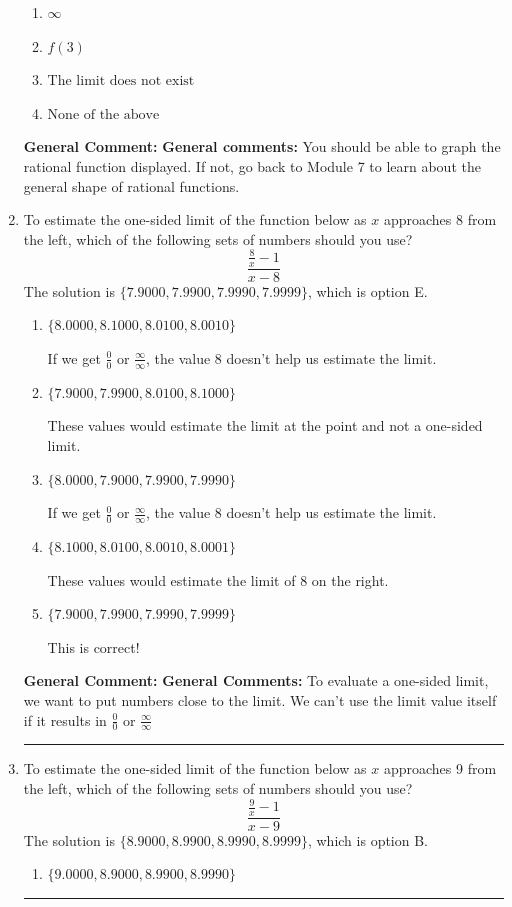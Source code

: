 \documentclass{extbook}[14pt]
\newcommand{\litem}[1]{\item #1

\rule{\textwidth}{0.4pt}}
\begin{document}
\begin{enumerate}
{\begin{enumerate}[label=\Alph*.]
\item \( \infty \)


\item \( f(3) \)


\item \( \text{The limit does not exist} \)


\item \( \text{None of the above} \)


\end{enumerate}

\textbf{General Comment:} \textbf{General comments:} You should be able to graph the rational function displayed. If not, go back to Module 7 to learn about the general shape of rational functions.
}
\litem{
To estimate the one-sided limit of the function below as $x$ approaches 8 from the left, which of the following sets of numbers should you use?
\[ \frac{\frac{8}{x} - 1}{x - 8} \]The solution is \( \{ 7.9000, 7.9900, 7.9990, 7.9999 \} \), which is option E.\begin{enumerate}[label=\Alph*.]
\item \( \{ 8.0000, 8.1000, 8.0100, 8.0010 \} \)

If we get $\frac{0}{0}$ or $\frac{\infty}{\infty}$, the value 8 doesn't help us estimate the limit.
\item \( \{ 7.9000, 7.9900, 8.0100, 8.1000 \} \)

These values would estimate the limit at the point and not a one-sided limit.
\item \( \{ 8.0000, 7.9000, 7.9900, 7.9990 \} \)

If we get $\frac{0}{0}$ or $\frac{\infty}{\infty}$, the value 8 doesn't help us estimate the limit.
\item \( \{ 8.1000, 8.0100, 8.0010, 8.0001 \} \)

These values would estimate the limit of 8 on the right.
\item \( \{ 7.9000, 7.9900, 7.9990, 7.9999 \} \)

This is correct!
\end{enumerate}

\textbf{General Comment:} \textbf{General Comments:} To evaluate a one-sided limit, we want to put numbers close to the limit. We can't use the limit value itself if it results in $\frac{0}{0}$ or $\frac{\infty}{\infty}$
}
\litem{
To estimate the one-sided limit of the function below as $x$ approaches 9 from the left, which of the following sets of numbers should you use?
\[ \frac{\frac{9}{x} - 1}{x - 9} \]The solution is \( \{ 8.9000, 8.9900, 8.9990, 8.9999 \} \), which is option B.\begin{enumerate}[label=\Alph*.]
\item \( \{ 9.0000, 8.9000, 8.9900, 8.9990 \} \)


\end{enumerate}}
\end{enumerate}
\end{document}
